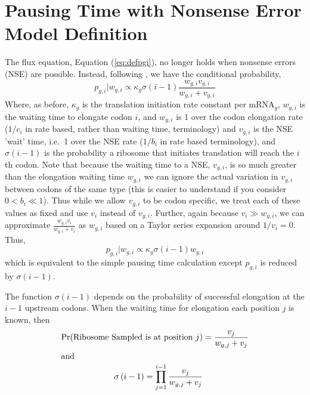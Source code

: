 \documentclass{article}
\newcommand{\elongWaitTime}{\ensuremath{w}\xspace}
\newcommand{\wgi}{\ensuremath{\elongWaitTime_{g,i}}\xspace}
\newcommand{\wgj}{\ensuremath{\elongWaitTime_{g,j}}\xspace}
\newcommand{\alphac}{\ensuremath{{\alpha_c}}\xspace}
\newcommand{\lambdacprime}{\ensuremath{{\lambda_c^\prime}}\xspace}
\newcommand{\nseWaitTime}{\ensuremath{v}\xspace}
\newcommand{\vgi}{\ensuremath{\nseWaitTime_{g,i}}\xspace}
\newcommand{\vi}{\ensuremath{\nseWaitTime_{i}}\xspace}
\newcommand{\vj}{\ensuremath{\nseWaitTime_{j}}\xspace}
\newcommand{\pgi}{\ensuremath{{p_{g,i}}}\xspace}
\newcommand{\ngc}{\ensuremath{{n_{g}^c}}\xspace}
\newcommand{\kappag}{\ensuremath{{\kappa_{g}}}\xspace}
\newcommand{\mRNAg}{mRNA$_g$\xspace}
\newcommand{\Ygc}{\ensuremath{{Y_{g}^c}}\xspace}
\begin{document}


\section*{Pausing Time with Nonsense Error Model Definition}
The flux equation, Equation (\ref{eq:defpgi}), no longer holds when nonsense errors (NSE) are possible.
Instead, following \citet{GilchristAndWagner2006}, we have the conditional probability,
\begin{equation}
\label{eq:defpgiNse}
\pgi|\wgi \propto \kappag \sigma(i-1) \frac{\wgi \vgi}{\wgi + \vgi}
\end{equation} 
Where, as before, \kappag is the translation initiation rate constant per \mRNAg, \wgi is the waiting time to elongate codon $i$, and  \wgi is 1 over the codon elongation rate ($1/c_i$ in rate based, rather than waiting time, terminology) and \vgi is the NSE 'wait' time, i.e.~1 over the NSE rate ($1/b_i$ in rate based terminology), and $\sigma(i-1)$ is the probability a ribosome that initiates translation will reach the $i$th codon.
Note that because the waiting time to a NSE, \vgi, is so much greater than the elongation waiting time \wgi we can ignore the actual variation in \vgi between codons of the same type (this is easier to understand if you consider $0 < b_i \ll 1$).
Thus while we allow \vgi to be codon specific, we treat each of these values as fixed and use \vi instead of \vgi.
Further, again because $\vi \gg \wgi$, we can approximate $\frac{\wgi \vi}{\wgi + \vi}$ as $\wgi$ based on a Taylor series expansion around $1/\vi = 0 $.
Thus,
\begin{equation}
\label{eq:defpgiNseApprox}
\pgi|\wgi \propto \kappag \sigma(i-1) \wgi
\end{equation} 
which is equivalent to the simple pausing time calculation except $\pgi$ is reduced by $\sigma(i-1)$.


The function $\sigma(i-1)$ depends on the probability of successful elongation at the $i-1$ upstream codons.
When the waiting time for elongation each position $j$ is known, then
 \begin{align}
  \label{eq:defElongPr}
\Pr(\text{Ribosome Sampled is at position $j$}) &=\frac{\vj}{\wgj + \vj} \\
\intertext{and}
   \label{eq:defSigmag}
   \sigma\left(i-1\right) = \prod_{j=1}^{i-1} \frac{\vj}{\wgj + \vj}
\end{align}
\end{document}
